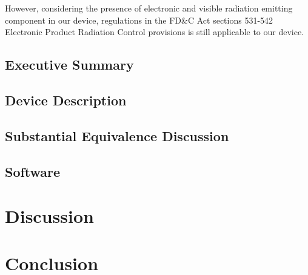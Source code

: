 \documentclass{article}
\begin{document}
However, considering the presence of electronic and visible radiation
emitting component in our device, regulations in the FD\&C Act
sections 531-542 Electronic Product Radiation Control provisions is
still applicable to our device.











\setcounter{subsection}{0}
\subsection{Executive Summary}
\subsection{Device Description}
\subsection{Substantial Equivalence Discussion}





\subsection{Software}




\section{Discussion}
\label{sec:discussion}

\section{Conclusion}
\label{sec:conclusion}


\newpage
{}


\end{document}
